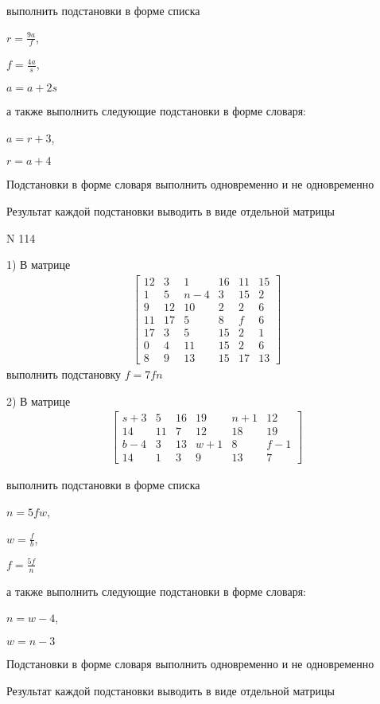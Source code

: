 \documentclass[11pt]{report}
\begin{document}
выполнить подстановки в форме списка

$r=\frac{9 a}{f}$,

$f=\frac{4 a}{s}$,

$a=a + 2 s$

а также выполнить следующие подстановки в форме словаря:

$a=r + 3$,

$r=a + 4$


    Подстановки в форме словаря выполнить одновременно и не одновременно


    Результат каждой подстановки выводить в виде отдельной матрицы

\newpage
N 114


    1) В матрице
\begin{align*}
\left[\begin{matrix}12 & 3 & 1 & 16 & 11 & 15\\1 & 5 & n - 4 & 3 & 15 & 2\\9 & 12 & 10 & 2 & 2 & 6\\11 & 17 & 5 & 8 & f & 6\\17 & 3 & 5 & 15 & 2 & 1\\0 & 4 & 11 & 15 & 2 & 6\\8 & 9 & 13 & 15 & 17 & 13\end{matrix}\right]
\end{align*}
выполнить подстановку $f=7 f n$


    2) В матрице
\begin{align*}
\left[\begin{matrix}s + 3 & 5 & 16 & 19 & n + 1 & 12\\14 & 11 & 7 & 12 & 18 & 19\\b - 4 & 3 & 13 & w + 1 & 8 & f - 1\\14 & 1 & 3 & 9 & 13 & 7\end{matrix}\right]
\end{align*}

выполнить подстановки в форме списка

$n=5 f w$,

$w=\frac{f}{b}$,

$f=\frac{5 f}{n}$

а также выполнить следующие подстановки в форме словаря:

$n=w - 4$,

$w=n - 3$


    Подстановки в форме словаря выполнить одновременно и не одновременно


    Результат каждой подстановки выводить в виде отдельной матрицы
\end{document}

